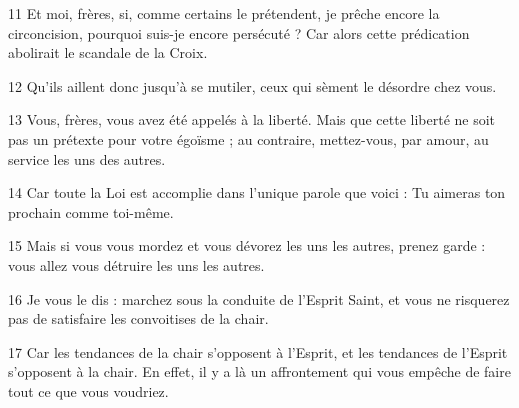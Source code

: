 
11 Et moi, frères, si, comme certains le prétendent, je prêche encore la circoncision, pourquoi suis-je encore persécuté ? Car alors cette prédication abolirait le scandale de la Croix.

12 Qu’ils aillent donc jusqu’à se mutiler, ceux qui sèment le désordre chez vous.

13 Vous, frères, vous avez été appelés à la liberté. Mais que cette liberté ne soit pas un prétexte pour votre égoïsme ; au contraire, mettez-vous, par amour, au service les uns des autres.

14 Car toute la Loi est accomplie dans l’unique parole que voici : Tu aimeras ton prochain comme toi-même.

15 Mais si vous vous mordez et vous dévorez les uns les autres, prenez garde : vous allez vous détruire les uns les autres.

16 Je vous le dis : marchez sous la conduite de l’Esprit Saint, et vous ne risquerez pas de satisfaire les convoitises de la chair.

17 Car les tendances de la chair s’opposent à l’Esprit, et les tendances de l’Esprit s’opposent à la chair. En effet, il y a là un affrontement qui vous empêche de faire tout ce que vous voudriez.
